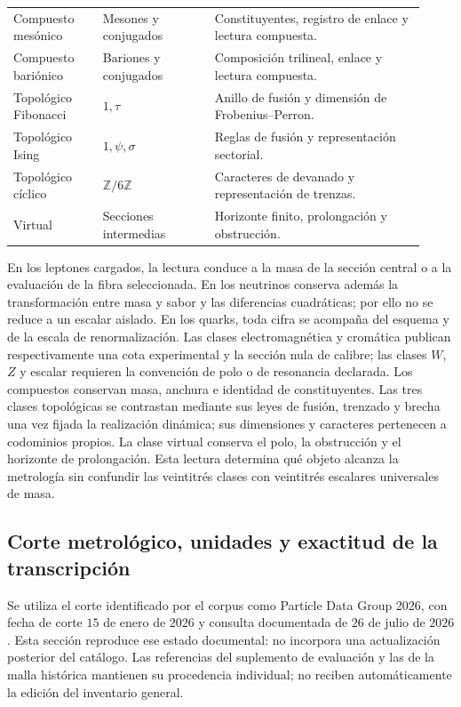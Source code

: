 \begin{longtable}{p{0.20\linewidth}p{0.25\linewidth}p{0.47\linewidth}}
Compuesto mesónico & Mesones y conjugados & Constituyentes, registro de enlace y lectura compuesta.\\
Compuesto bariónico & Bariones y conjugados & Composición trilineal, enlace y lectura compuesta.\\
Topológico Fibonacci & \(1,\tau\) & Anillo de fusión y dimensión de Frobenius--Perron.\\
Topológico Ising & \(1,\psi,\sigma\) & Reglas de fusión y representación sectorial.\\
Topológico cíclico & \(\mathbb Z/6\mathbb Z\) & Caracteres de devanado y representación de trenzas.\\
Virtual & Secciones intermedias & Horizonte finito, prolongación y obstrucción.\\
\end{longtable}
\endgroup

En los leptones cargados, la lectura conduce a la masa de la sección central
o a la evaluación de la fibra seleccionada. En los neutrinos conserva además
la transformación entre masa y sabor y las diferencias cuadráticas; por ello
no se reduce a un escalar aislado. En los quarks, toda cifra se acompaña del
esquema y de la escala de renormalización. Las clases electromagnética y
cromática publican respectivamente una cota experimental y la sección nula
de calibre; las clases \(W\), \(Z\) y escalar requieren la convención de polo
o de resonancia declarada. Los compuestos conservan masa, anchura e identidad
de constituyentes. Las tres clases topológicas se contrastan mediante sus
leyes de fusión, trenzado y brecha una vez fijada la realización dinámica;
sus dimensiones y caracteres pertenecen a codominios propios. La clase
virtual conserva el polo, la obstrucción y el horizonte de prolongación. Esta
lectura determina qué objeto alcanza la metrología sin confundir las
veintitrés clases con veintitrés escalares universales de masa.

\subsection{Corte metrológico, unidades y exactitud de la transcripción}
\label{vi:subsec:vi-corte-metrologico}

Se utiliza el corte identificado por el corpus como Particle Data Group
2026, con fecha de corte \(15\) de enero de \(2026\) y consulta
documentada de \(26\) de julio de \(2026\). Esta sección reproduce ese
estado documental: no incorpora una actualización posterior del catálogo.
Las referencias del suplemento de evaluación y las de la malla histórica
mantienen su procedencia individual; no reciben automáticamente la edición
del inventario general.

